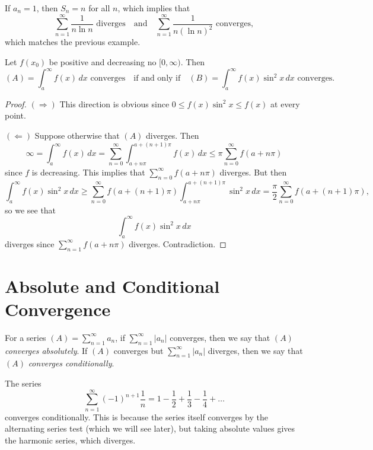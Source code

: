 \begin{remark}
  If $a_n = 1$, then $S_n = n$ for all $n$, which implies
  that
  \[
    \sum_{n = 1}^\infty \frac{1}{n \ln n} \text{ diverges}
    \quad \text{and} \quad
    \sum_{n = 1}^\infty \frac{1}{n (\ln n)^2} \text{ converges},
  \]
  which matches the previous example.
\end{remark}

\begin{example}
  Let $f(x_0)$ be positive and decreasing no
  $[0, \infty)$. Then
  \[
    (A) = \int_a^\infty f(x)\, dx \text{ converges} \quad
  \text{if and only if} \quad
  (B) = \int_a^\infty f(x) \sin^2 x\, dx \text{ converges}.
  \]
\end{example}

\begin{proof}
  $(\Rightarrow)$ This direction is obvious since
  $0 \le f(x) \sin^2 x \le f(x)$ at every point.

  $(\Leftarrow)$ Suppose otherwise that $(A)$ diverges. Then
  \[
    \infty = \int_a^\infty f(x)\, dx
    = \sum_{n = 0}^\infty \int_{a + n\pi}^{a + (n + 1)\pi}
    f(x)\, dx
    \le \pi \sum_{n = 0}^\infty f(a + n\pi)
  \]
  since $f$ is decreasing. This implies that
  $\sum_{n = 0}^\infty f(a + n\pi)$ diverges. But then
  \[
    \int_a^\infty f(x) \sin^2 x\, dx
    \ge \sum_{n = 0}^\infty f(a + (n + 1)\pi) \int_{a + n\pi}^{a + (n + 1)\pi} \sin^2 x\, dx
    = \frac{\pi}{2}\sum_{n = 0}^\infty f(a + (n + 1)\pi),
  \]
  so we see that
  \[
    \int_a^\infty f(x) \sin^2 x\, dx
  \]
  diverges since $\sum_{n = 1}^\infty f(a + n\pi)$ diverges. Contradiction.
\end{proof}

\section{Absolute and Conditional Convergence}

\begin{definition}
  For a series $(A) = \sum_{n = 1}^\infty a_n$, if
  $\sum_{n = 1}^\infty |a_n|$ converges, then we say that
  $(A)$ \emph{converges absolutely}. If $(A)$ converges
  but $\sum_{n = 1}^\infty |a_n|$ diverges, then we say
  that $(A)$ \emph{converges conditionally}.
\end{definition}

\begin{example}
  The series
  \[
    \sum_{n = 1}^\infty (-1)^{n + 1} \frac{1}{n}
    = 1 - \frac{1}{2} + \frac{1}{3} - \frac{1}{4} + \dots
  \]
  converges conditionally. This is because the series
  itself converges by the alternating series test (which
  we will see later), but
  taking absolute values gives the harmonic series,
  which diverges.
\end{example}

